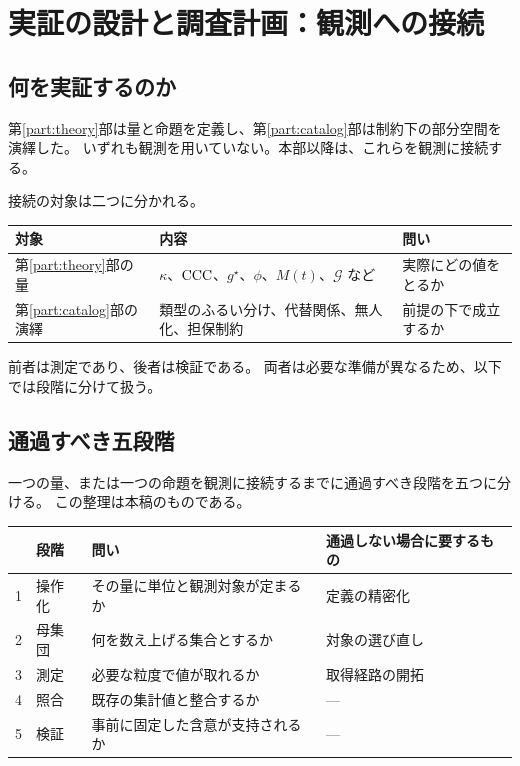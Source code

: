 \chapter{実証の設計と調査計画：観測への接続}
\label{ch:design}

\section{何を実証するのか}

第\ref{part:theory}部は量と命題を定義し、第\ref{part:catalog}部は制約下の部分空間を演繹した。
いずれも観測を用いていない。本部以降は、これらを観測に接続する。

接続の対象は二つに分かれる。

\begin{center}
\begin{tabularx}{\textwidth}{@{}lXl@{}}
\toprule
対象 & 内容 & 問い \\
\midrule
第\ref{part:theory}部の量 & $\kappa$、$\mathrm{CCC}$、$g^\star$、$\phi$、$M(t)$、$\mathcal{G}$ など & 実際にどの値をとるか \\
第\ref{part:catalog}部の演繹 & 類型のふるい分け、代替関係、無人化、担保制約 & 前提の下で成立するか \\
\bottomrule
\end{tabularx}
\label{tab:empirical-targets}
\end{center}

前者は測定であり、後者は検証である。
両者は必要な準備が異なるため、以下では段階に分けて扱う。

\section{通過すべき五段階}
\label{sec:five-stages}

一つの量、または一つの命題を観測に接続するまでに通過すべき段階を五つに分ける。
この整理は本稿のものである。

\begin{center}
\begin{tabularx}{\textwidth}{@{}llXl@{}}
\toprule
 & 段階 & 問い & 通過しない場合に要するもの \\
\midrule
1 & 操作化 & その量に単位と観測対象が定まるか & 定義の精密化 \\
2 & 母集団 & 何を数え上げる集合とするか & 対象の選び直し \\
3 & 測定 & 必要な粒度で値が取れるか & 取得経路の開拓 \\
\midrule
4 & 照合 & 既存の集計値と整合するか & --- \\
5 & 検証 & 事前に固定した含意が支持されるか & --- \\
\bottomrule
\end{tabularx}
\label{tab:five-stages}
\end{center}

